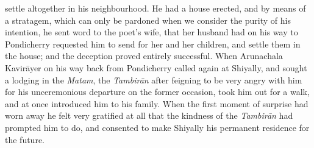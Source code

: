\documentclass{article}
\begin{document}
settle altogether in his neighbourhood. He had a house erected, and by means of a stratagem, which can only be pardoned when we consider the purity of his intention, he sent word to the poet's wife, that her husband had on his way to Pondicherry requested him to send for her and her children, and settle them in the house; and the deception proved entirely successful. When Arunachala Kavir\={a}yer on his way back from Pondicherry called again at Shiyally, and sought a lodging in the \emph{Matam}, the \emph{Tambir\={a}n} after feigning to be very angry with him for his unceremonious departure on the former occasion, took him out for a walk, and at once introduced him to his family. When the first moment of surprise had worn away he felt very gratified at all that the kindness of the \emph{Tambir\={a}n} had prompted him to do, and consented to make Shiyally his permanent residence for the future.
\end{document}
